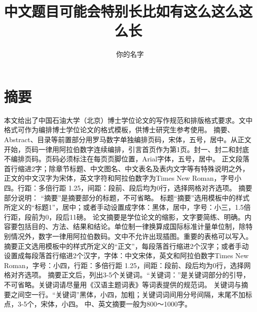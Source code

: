 \title{中文题目可能会特别长比如有这么这么这么长}%
\author{~你的名字}%

\maketitle%
\makeenglishtitle%
\makedeclaration%
\chapter{摘\qquad 要}%

本文给出了中国石油大学（北京）博士学位论文的写作规范和排版格式要求。文中格式可作为编排博士学位论文的格式模板，供博士研究生参考使用。
摘要、Abstract、目录等前置部分用罗马数字单独编排页码，宋体，五号，居中。从正文开始，页码一律用阿拉伯数字连续编排，引言首页作为第1页。封一、封二和封底不编排页码。页码必须标注在每页页脚位置，Arial字体，五号，居中。
正文段落首行缩进2字；除章节标题、中文图名、中文表名及表内文字等有特殊说明之外，正文的中文汉字为宋体，英文字符和阿拉伯数字为Times New Roman，字号小四。行距：多倍行距 1.25，间距：段前、段后均为0行，选择网格对齐选项。
摘要部分说明：
“摘要”是摘要部分的标题，不可省略。
标题“摘要”选用模板中的样式所定义的“标题1”，居中；或者手动设置成字体：黑体，居中，字号：小三，1.5倍行距，段前为0，段后11磅。
论文摘要是学位论文的缩影，文字要简练、明确。内容要包括目的、方法、结果和结论。单位制一律换算成国际标准计量单位制，除特别情况外，数字一律用阿拉伯数码。文中不允许出现插图。重要的表格可以写入。
摘要正文选用模板中的样式所定义的“正文”，每段落首行缩进2个汉字；或者手动设置成每段落首行缩进2个汉字，字体：中文宋体，英文和阿拉伯数字Times New Roman，字号：小四，行距：多倍行距 1.25，间距：段前、段后均为0行，选择网格对齐选项。
摘要正文后，列出3-5个关键词。“关键词：”是关键词部分的引导，不可省略。关键词请尽量用《汉语主题词表》等词表提供的规范词。
关键词与摘要之间空一行。“关键词”黑体，小四，加粗；关键词词间用分号间隔，末尾不加标点，3-5个，宋体，小四。
中、英文摘要一般为800～1000字。

